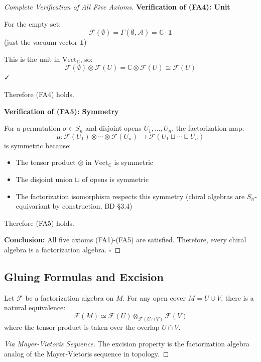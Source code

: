 \begin{example}
\begin{proof}[Complete Verification of All Five Axioms]
\textbf{Verification of (FA4): Unit}

For the empty set:
$$\mathcal{F}(\emptyset) = \Gamma(\emptyset, \mathcal{A}) = \mathbb{C} \cdot \mathbf{1}$$
(just the vacuum vector $\mathbf{1}$)

This is the unit in $\text{Vect}_{\mathbb{C}}$, so:
$$\mathcal{F}(\emptyset) \otimes \mathcal{F}(U) = \mathbb{C} \otimes \mathcal{F}(U) 
   \cong \mathcal{F}(U)$$ ✓

Therefore (FA4) holds.

\textbf{Verification of (FA5): Symmetry}

For a permutation $\sigma \in S_n$ and disjoint opens $U_1, \ldots, U_n$, the 
factorization map:
$$\mu: \mathcal{F}(U_1) \otimes \cdots \otimes \mathcal{F}(U_n) \to 
   \mathcal{F}(U_1 \sqcup \cdots \sqcup U_n)$$
is symmetric because:
\begin{itemize}
\item The tensor product $\otimes$ in $\text{Vect}_{\mathbb{C}}$ is symmetric
\item The disjoint union $\sqcup$ of opens is symmetric
\item The factorization isomorphism respects this symmetry (chiral algebras are 
   $S_n$-equivariant by construction, BD §3.4)
\end{itemize}

Therefore (FA5) holds.

\textbf{Conclusion:} All five axioms (FA1)-(FA5) are satisfied. Therefore, every 
chiral algebra is a factorization algebra. $\square$
\end{proof}

\subsection{Gluing Formulas and Excision}

\begin{theorem}
\label{thm:excision-factorization}
Let $\mathcal{F}$ be a factorization algebra on $M$. For any open cover 
$M = U \cup V$, there is a natural equivalence:
$$\mathcal{F}(M) \simeq \mathcal{F}(U) \otimes_{\mathcal{F}(U \cap V)} \mathcal{F}(V)$$
where the tensor product is taken over the overlap $U \cap V$.
\end{theorem}

\begin{proof}[Via Mayer-Vietoris Sequence]
The excision property is the factorization algebra analog of the Mayer-Vietoris 
sequence in topology.


\end{proof}
\end{example}
